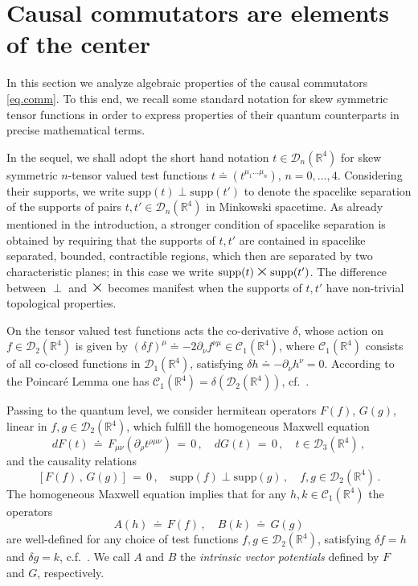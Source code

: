 \documentclass[11pt]{article}
\numberwithin{equation}{section}
\newcommand{\RR}{{\mathbb R}}
\newcommand{\Cc}{{\mathcal{C}}}
\newcommand{\Dc}{{\mathcal{D}}}
\newcommand{\Times}{\mbox{\Large $\times$}}      %
\newcommand{\supp}{{\mathrm{supp}}}
\begin{document}
\section{Causal commutators are elements of the center}
\label{sec2}

In this section we analyze algebraic properties of the   
causal commutators 
\eqref{eq.comm}. To this end, we recall some standard
notation for skew symmetric 
tensor functions in order to express  
properties of their quantum counterparts in precise mathematical terms. 

\medskip
In the sequel, we shall adopt the short hand notation $t \in \Dc_n(\RR^4)$
for skew symmetric $n$-tensor valued test functions
$t \doteq (t^{\mu_1 \ldots \mu_n})$, $n = 0, \dots, 4$. Considering their 
supports, we write $\supp(t) \perp \supp(t')$ to denote 
the spacelike separation of the supports 
of pairs $t,t' \in \Dc_n(\RR^4)$ in Minkowski spacetime. 
As already mentioned in the introduction, a stronger condition 
of spacelike separation is obtained by requiring that the 
supports of $t,t'$  are contained in 
spacelike separated, bounded, contractible regions,
which then are separated by two characteristic planes; 
in this case we write
%
$\supp(t) \, \Times \, \supp(t')$.
%
The difference between $\perp$ and $\Times$ becomes manifest when 
the supports of $t,t'$ have non-trivial topological properties.

\medskip
On the tensor valued test functions acts 
the co-derivative $\delta$, whose action on  
\mbox{$f \in \Dc_2(\RR^4)$} is given by  
$(\delta f)^\mu \doteq -2\partial_\nu f^{\nu \mu} \in \Cc_1(\RR^4)$,
where $\Cc_1(\RR^4)$ consists of all co-closed
functions in \mbox{$\Dc_1(\RR^4)$}, satisfying   
$\delta h \doteq - \partial_\nu h^\nu = 0$.
According to the Poincar\'e Lemma one has 
$\Cc_1(\RR^4) = \delta(\Dc_2(\RR^4))$, 
cf.\ \cite{BuCiRuVa1}.

\medskip 
Passing to the quantum level, we 
consider hermitean operators 
%
$F(f)$, $G(g)$,
%
linear in $f,g \in \Dc_2(\RR^4)$, 
which fulfill the homogeneous Maxwell equation
%
\begin{equation}
\label{eq.maxw}
dF(t) \, \doteq \, F_{\mu\nu}(\partial_\rho t^{\rho\mu\nu}) \, = \, 0 \, ,
\quad dG(t) \, = \, 0 \, , \quad t \in \Dc_3(\RR^4) \, ,
\end{equation}
%
and the causality relations
%
\begin{equation}
\label{eq.caus}
[ F(f) \, , \, G(g) ] \, = \, 0 \, , \quad 
\supp(f) \perp \supp(g) \, , \quad f,g \in \Dc_2(\RR^4) \, .
\end{equation}
%
The homogeneous Maxwell equation implies that for any
$h, k \in \Cc_1(\RR^4)$ the operators
%
$$
A(h) \, \doteq   \, F(f) \, , \quad B(k) \, \doteq \, G(g)
$$
%
are well-defined for any choice of 
test functions $f,g \in \Dc_2(\RR^4)$, satisfying  
$\delta f = h$ and $\delta g = k$, c.f.\ \cite{BuCiRuVa1}. 
We call $A$ and $B$ the \emph{intrinsic vector potentials} 
defined by $F$ and $G$, respectively.
\end{document}
